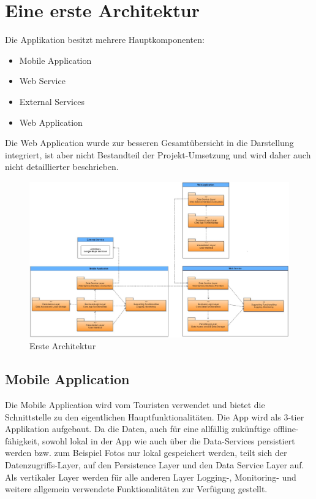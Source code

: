 \documentclass[a4paper,10pt,xetex]{article}
\begin{document}
\section{Eine erste Architektur}\label{eine-erste-architektur}
Die Applikation besitzt mehrere Hauptkomponenten:
\begin{itemize}
  \item Mobile Application
  \item Web Service
  \item External Services
  \item Web Application
\end{itemize}
Die Web Application wurde zur besseren Gesamtübersicht in die Darstellung integriert, ist aber nicht Bestandteil der Projekt-Umsetzung und wird daher auch nicht detaillierter beschrieben.

\begin{figure}
\centering
\includegraphics{first_architecture1.jpg}
\caption{Erste Architektur}
\end{figure}


\subsection{Mobile Application}\label{mobile-application}
Die Mobile Application wird vom Touristen
verwendet und bietet die Schnittstelle zu den eigentlichen
Hauptfunktionalitäten. Die App wird als 3-tier Applikation aufgebaut. Da
die Daten, auch für eine allfällig zukünftige offline-fähigkeit, sowohl
lokal in der App wie auch über die Data-Services persistiert werden bzw.
zum Beispiel Fotos nur lokal gespeichert werden, teilt sich der
Datenzugriffs-Layer, auf den Persistence Layer und den Data Service
Layer auf. Als vertikaler Layer werden für alle anderen Layer Logging-,
Monitoring- und weitere allgemein verwendete Funktionalitäten zur
Verfügung gestellt.
\end{document}
